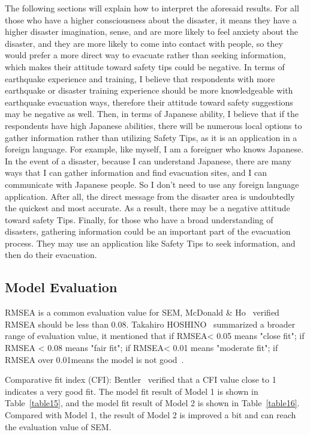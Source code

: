 The following sections will explain how to interpret the aforesaid results. For all those who have a higher consciousness about the disaster, it means they have a higher disaster imagination, sense, and are more likely to feel anxiety about the disaster, and they are more likely to come into contact with people, so they would prefer a more direct way to evacuate rather than seeking information, which makes their attitude toward safety tips could be negative. In terms of earthquake experience and training, I believe that respondents with more earthquake or disaster training experience should be more knowledgeable with earthquake evacuation ways, therefore their attitude toward safety suggestions may be negative as well. Then, in terms of Japanese ability, I believe that if the respondents have high Japanese abilities, there will be numerous local options to gather information rather than utilizing Safety Tips, as it is an application in a foreign language. For example, like myself, I am a foreigner who knows Japanese. In the event of a disaster, because I can understand Japanese, there are many ways that I can gather information and find evacuation sites, and I can communicate with Japanese people. So I don't need to use any foreign language application. After all, the direct message from the disaster area is undoubtedly the quickest and most accurate. As a result, there may be a negative attitude toward safety Tips. Finally, for those who have a broad understanding of disasters, gathering information could be an important part of the evacuation process. They may use an application like Safety Tips to seek information, and then do their evacuation.

\subsection{Model Evaluation}
RMSEA is a common evaluation value for SEM, McDonald \& Ho~\cite{ref2} verified RMSEA should be less than 0.08. Takahiro HOSHINO~\cite{SEMres} summarized a broader range of evaluation value, it mentioned that if RMSEA< 0.05 means "close fit"; if RMSEA < 0.08 means "fair fit"; if RMSEA< 0.01 means "moderate fit"; if RMSEA over 0.01means the model is not good~\cite{ref3,ref4,ref5}. 

Comparative fit index (CFI): Bentler~\cite{ref6} verified that a CFI value close to 1 indicates a very good fit.
The model fit result of Model 1 is shown in Table~\ref{table15}, and the model fit result of Model 2 is shown in Table~\ref{table16}. Compared with Model 1, the result of Model 2 is improved a bit and can reach the evaluation value of SEM.

